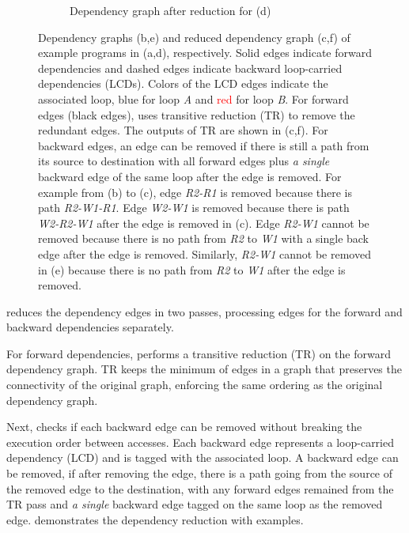 \begin{figure}
\begin{subfigure}[b]{0.3\textwidth}
\caption{
  Dependency graph after reduction for (d)
}
\end{subfigure}
\caption[Examples for dependency graph reduction]{
  Dependency graphs (b,e) and reduced dependency graph (c,f) of example programs in (a,d),
  respectively.
  Solid edges indicate forward dependencies and
  dashed edges indicate backward loop-carried dependencies (LCDs).
  Colors of the LCD edges indicate the associated loop, \textcolor{pureblue}{blue} for loop \emph{A} and
  \textcolor{red}{red} for loop \emph{B}.
  For forward edges (black edges), \name uses transitive reduction (TR) to remove the redundant
  edges. The outputs of TR are shown in (c,f).
  For backward edges, an edge can be removed if there is still a path from its source to
  destination with all forward edges plus \emph{a single} backward edge of the same loop after the edge is
  removed.
  For example from (b) to (c), edge \emph{R2-R1} is removed because there is path \emph{R2-W1-R1}.
  Edge \emph{W2-W1} is removed because there is path \emph{W2-R2-W1} after the edge is removed in (c). 
  Edge \emph{R2-W1} cannot be removed because there is no path from \emph{R2} to \emph{W1} with a
  single back edge after the edge is removed.
  Similarly, \emph{R2-W1} cannot be
  removed in (e) because there is no path from \emph{R2} to \emph{W1} after the edge is removed.
}
\label{fig:graphred}
\end{figure}

\name reduces the dependency edges in two passes, processing edges for the forward and backward dependencies separately.

For forward dependencies, \name performs a transitive reduction (TR)\cite{tr} on the forward dependency
graph. TR keeps the minimum of edges in a graph that preserves the connectivity of the original
graph, enforcing the same ordering as the original dependency graph.

Next, \name checks if each backward edge can be removed without breaking the execution order between
accesses. 
Each backward edge represents a loop-carried dependency (LCD) and is tagged with the associated loop.
A backward edge can be removed, if after removing the edge, there is a path going from the source of the removed edge to the
destination, with any forward edges remained from the TR pass and 
\emph{a single} backward edge tagged on the same loop as the removed edge.
 demonstrates the dependency reduction with examples.

